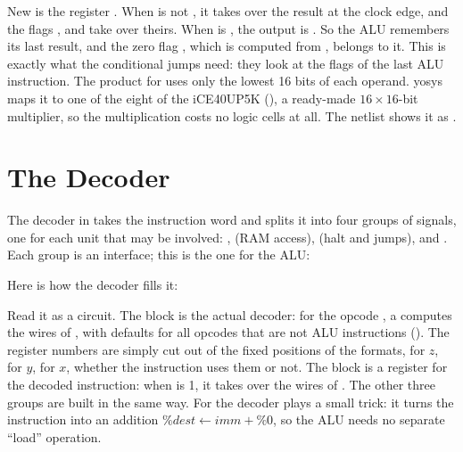 
New is the register . When  is not , it takes over
the result at the clock edge, and the flags ,  and
 take over theirs. When  is , the output
 is . So the ALU remembers its last result, and the zero
flag , which is computed from , belongs to it. This is
exactly what the conditional jumps need: they look at the flags of the last
ALU instruction. The product for  uses only the lowest 16 bits of
each operand. yosys maps it to one of the eight  of the
iCE40UP5K (), a ready-made $16\times16$-bit multiplier, so the
multiplication costs no logic cells at all. The netlist shows it as
.

\section{The Decoder}
\label{sec:step09-decoder}

The decoder in  takes the instruction word  and
splits it into four groups of signals, one for each unit that may be
involved: ,  (RAM access),  (halt and
jumps), and . Each group is an interface; this is the one for the
ALU:


Here is how the decoder fills it:


Read it as a circuit. The  block is the actual decoder: for
the opcode , a  computes the wires of
, with defaults for all opcodes that are not ALU
instructions (). The register numbers are simply cut out of the
fixed positions of the formats,  for $z$,  for $y$,
 for $x$, whether the instruction uses them or not. The
 block is a register for the decoded instruction: when 
is 1, it takes over the wires of . The other three groups
are built in the same way. For  the decoder plays a small trick: it
turns the instruction into an addition $\%\mathit{dest} \gets
\mathit{imm} + \%0$, so the ALU needs no separate ``load'' operation.

